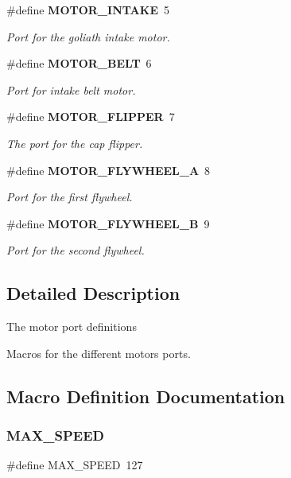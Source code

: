 \begin{DoxyCompactItemize}
\#define \textbf{ M\+O\+T\+O\+R\+\_\+\+I\+N\+T\+A\+KE}~5
\begin{DoxyCompactList}\small\item\em Port for the goliath intake motor. \end{DoxyCompactList}\item 
\#define \textbf{ M\+O\+T\+O\+R\+\_\+\+B\+E\+LT}~6
\begin{DoxyCompactList}\small\item\em Port for intake belt motor. \end{DoxyCompactList}\item 
\#define \textbf{ M\+O\+T\+O\+R\+\_\+\+F\+L\+I\+P\+P\+ER}~7
\begin{DoxyCompactList}\small\item\em The port for the cap flipper. \end{DoxyCompactList}\item 
\#define \textbf{ M\+O\+T\+O\+R\+\_\+\+F\+L\+Y\+W\+H\+E\+E\+L\+\_\+A}~8
\begin{DoxyCompactList}\small\item\em Port for the first flywheel. \end{DoxyCompactList}\item 
\#define \textbf{ M\+O\+T\+O\+R\+\_\+\+F\+L\+Y\+W\+H\+E\+E\+L\+\_\+B}~9
\begin{DoxyCompactList}\small\item\em Port for the second flywheel. \end{DoxyCompactList}\end{DoxyCompactItemize}


\subsection{Detailed Description}
The motor port definitions

Macros for the different motors ports. 



\subsection{Macro Definition Documentation}
\mbox{\label{motor__ports_8h_ac2cd96d53dd3ba6407db6766c3d92b26}} 
\subsubsection{M\+A\+X\+\_\+\+S\+P\+E\+ED}
{\footnotesize\ttfamily \#define M\+A\+X\+\_\+\+S\+P\+E\+ED~127}



